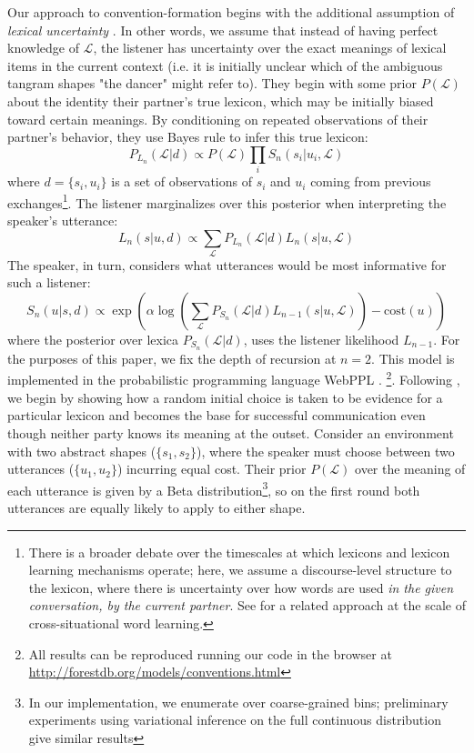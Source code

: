 Our approach to convention-formation begins with the additional assumption of \emph{lexical uncertainty} \cite{SmithGoodmanFrank13_RecursivePragmaticReasoningNIPS,BergenLevyGoodman16_LexicalUncertainty}. 
In other words, we assume that instead of having perfect knowledge of $\mathcal{L}$, the listener has uncertainty over the exact meanings of lexical items in the current context (i.e. it is initially unclear which of the ambiguous tangram shapes "the dancer" might refer to). They begin with some prior $P(\mathcal{L})$ about the identity their partner's true lexicon, which may be initially biased toward certain meanings. By conditioning on repeated observations of their partner's behavior, they use Bayes rule to infer this true lexicon:
$$P_{L_n}(\mathcal{L} | d) \propto P(\mathcal{L})\prod_i S_n(s_i|u_i, \mathcal{L})$$
where $d = \{s_i, u_i\}$ is a set of observations of $s_i$ and $u_i$ coming from previous exchanges\footnote{There is a broader debate over the timescales at which lexicons and lexicon learning mechanisms operate; here, we assume a discourse-level structure to the lexicon, where there is uncertainty over how words are used \emph{in the given conversation, by the current partner}. See \cite{FrankGoodmanTenenbaum09_Wurwur} for a related approach at the scale of cross-situational word learning.}. 
The listener marginalizes over this posterior when interpreting the speaker's utterance:
$$L_n(s | u, d) \propto \sum_\mathcal{L}P_{L_n}(\mathcal{L}|d)L_n(s|u,\mathcal{L})$$
The speaker, in turn, considers what utterances would be most informative for such a listener:
$$S_n(u | s, d) \propto \exp( \alpha\log\left(\sum_{\mathcal{L}} P_{S_n}(\mathcal{L} | d) L_{n-1}(s | u, \mathcal{L})\right) - \textrm{cost}(u) )$$
where the posterior over lexica $P_{S_n}(\mathcal{L} | d)$, uses the listener likelihood $L_{n-1}$. For the purposes of this paper, we fix the depth of recursion at $n = 2$.
This model is implemented in the probabilistic programming language WebPPL \cite{GoodmanStuhlmuller14_DIPPL}. \footnote{All results can be reproduced running our code in the browser at \url{http://forestdb.org/models/conventions.html}}. 
Following \cite{SmithGoodmanFrank13_RecursivePragmaticReasoningNIPS}, we begin by showing how a random initial choice is taken to be evidence for a particular lexicon and becomes the base for successful communication even though neither party knows its meaning at the outset.
Consider an environment with two abstract shapes ($\{s_1, s_2\}$), where the speaker must choose between two utterances ($\{u_1, u_2\}$) incurring equal cost. 
Their prior $P(\mathcal{L})$ over the meaning of each utterance is given by a Beta distribution\footnote{In our implementation, we enumerate over coarse-grained bins; preliminary experiments using variational inference on the full continuous distribution give similar results}, so on the first round both utterances are equally likely to apply to either shape. 
